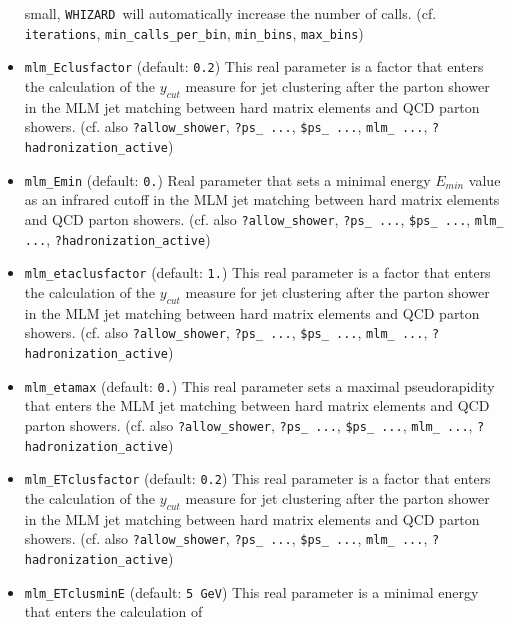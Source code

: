 \documentclass[12pt]{book}
\newcommand{\ttt}[1]{\texttt{#1}}
\newcommand{\whizard}{\texttt{WHIZARD}}
\begin{document}
\begin{itemize}
small, \whizard\ will automatically increase the number of
calls. (cf. \ttt{iterations}, \ttt{min\_calls\_per\_bin},
\ttt{min\_bins}, \ttt{max\_bins})
\item
\ttt{mlm\_Eclusfactor} \qquad (default: \ttt{0.2}) \newline
This real parameter is a factor that enters the calculation of the
$y_{cut}$ measure for jet clustering after the parton shower in the
MLM jet matching between hard matrix elements and QCD parton showers. 
(cf. also \ttt{?allow\_shower}, \ttt{?ps\_ ...}, \ttt{\$ps\_ ...},
\ttt{mlm\_ ...}, \ttt{?hadronization\_active})  
\item
\ttt{mlm\_Emin} \qquad (default: \ttt{0.}) \newline
Real parameter that sets a minimal energy $E_{min}$ value as an
infrared cutoff in the MLM jet matching between hard matrix elements
and QCD parton showers.  (cf. also \ttt{?allow\_shower}, \ttt{?ps\_
...}, \ttt{\$ps\_ ...}, \ttt{mlm\_ ...}, \ttt{?hadronization\_active}) 
\item
\ttt{mlm\_etaclusfactor} \qquad (default: \ttt{1.}) \newline
This real parameter is a factor that enters the calculation of the
$y_{cut}$ measure for jet clustering after the parton shower in the
MLM jet matching between hard matrix elements and QCD parton showers. 
(cf. also \ttt{?allow\_shower}, \ttt{?ps\_ ...}, \ttt{\$ps\_ ...},
\ttt{mlm\_ ...}, \ttt{?hadronization\_active})  
\item
\ttt{mlm\_etamax} \qquad (default: \ttt{0.}) \newline
This real parameter sets a maximal pseudorapidity that enters the 
MLM jet matching between hard matrix elements and QCD parton showers.
(cf. also \ttt{?allow\_shower}, \ttt{?ps\_ ...}, \ttt{\$ps\_ ...},
\ttt{mlm\_ ...}, \ttt{?hadronization\_active}) 
\item
\ttt{mlm\_ETclusfactor} \qquad (default: \ttt{0.2}) \newline
This real parameter is a factor that enters the calculation of the
$y_{cut}$ measure for jet clustering after the parton shower in the
MLM jet matching between hard matrix elements and QCD parton showers. 
(cf. also \ttt{?allow\_shower}, \ttt{?ps\_ ...}, \ttt{\$ps\_ ...},
\ttt{mlm\_ ...}, \ttt{?hadronization\_active})  
\item
\ttt{mlm\_ETclusminE} \qquad (default: \ttt{5 GeV}) \newline
This real parameter is a minimal energy that enters the calculation of

\end{itemize}
\end{document}
